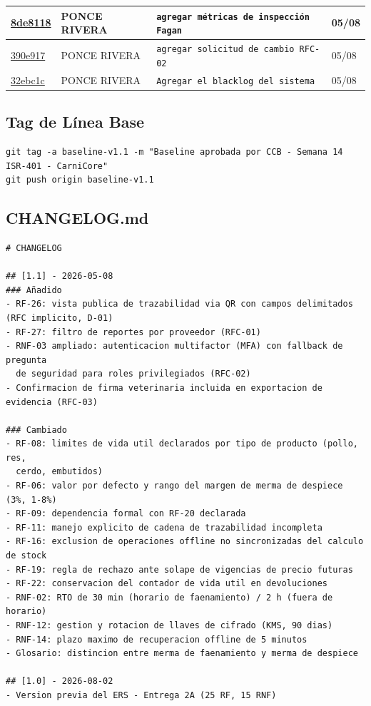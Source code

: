 \documentclass[11pt,a4paper]{article}
\begin{document}
\begin{longtable}{|p{1.9cm}|p{2.4cm}|p{7.6cm}|p{1.3cm}|}
\href{https://github.com/EdhuXav/EdhuXav-ISR401-PFC-ERS-EquipoJ/commit/8de811832be84b6437df96de474111d9f7eedef5}{8de8118}
& PONCE RIVERA & \texttt{agregar métricas de inspección Fagan} & 05/08 \\ \hline

\href{https://github.com/EdhuXav/EdhuXav-ISR401-PFC-ERS-EquipoJ/commit/390e9171fbcef63a9b64e2bab3bfb0ec87a6fdae}{390e917}
& PONCE RIVERA & \texttt{agregar solicitud de cambio RFC-02} & 05/08 \\ \hline

\href{https://github.com/EdhuXav/EdhuXav-ISR401-PFC-ERS-EquipoJ/commit/32ebc1c85c1f0d5a36e7e667f05e327dca3229c2}{32ebc1c}
& PONCE RIVERA & \texttt{Agregar el blacklog del sistema} & 05/08 \\ \hline

\end{longtable}

\subsection{Tag de Línea Base}
\begin{verbatim}
git tag -a baseline-v1.1 -m "Baseline aprobada por CCB - Semana 14 ISR-401 - CarniCore"
git push origin baseline-v1.1
\end{verbatim}

\subsection{CHANGELOG.md}
\begin{verbatim}
# CHANGELOG

## [1.1] - 2026-05-08
### Añadido
- RF-26: vista publica de trazabilidad via QR con campos delimitados (RFC implicito, D-01)
- RF-27: filtro de reportes por proveedor (RFC-01)
- RNF-03 ampliado: autenticacion multifactor (MFA) con fallback de pregunta
  de seguridad para roles privilegiados (RFC-02)
- Confirmacion de firma veterinaria incluida en exportacion de evidencia (RFC-03)

### Cambiado
- RF-08: limites de vida util declarados por tipo de producto (pollo, res,
  cerdo, embutidos)
- RF-06: valor por defecto y rango del margen de merma de despiece (3%, 1-8%)
- RF-09: dependencia formal con RF-20 declarada
- RF-11: manejo explicito de cadena de trazabilidad incompleta
- RF-16: exclusion de operaciones offline no sincronizadas del calculo de stock
- RF-19: regla de rechazo ante solape de vigencias de precio futuras
- RF-22: conservacion del contador de vida util en devoluciones
- RNF-02: RTO de 30 min (horario de faenamiento) / 2 h (fuera de horario)
- RNF-12: gestion y rotacion de llaves de cifrado (KMS, 90 dias)
- RNF-14: plazo maximo de recuperacion offline de 5 minutos
- Glosario: distincion entre merma de faenamiento y merma de despiece

## [1.0] - 2026-08-02
- Version previa del ERS - Entrega 2A (25 RF, 15 RNF)
\end{verbatim}
\end{document}
